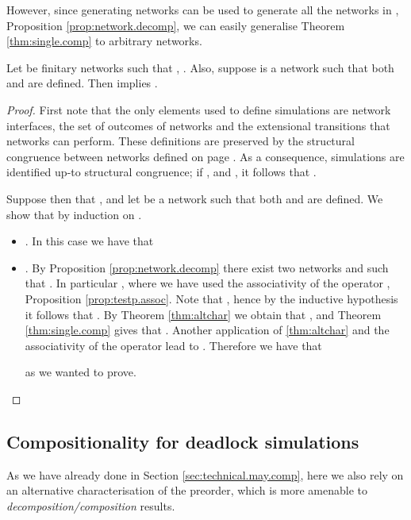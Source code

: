 \documentclass{LMCS}
\begin{document}
However, since generating networks can be used to generate 
all the networks in , Proposition  
\ref{prop:network.decomp}, we can 
easily generalise Theorem \ref{thm:single.comp} to arbitrary 
networks.

\begin{cor}\label{cor:composition}
Let  be finitary networks such that , . 
Also, suppose  is a network such that both 
 and  are defined. 
Then  implies  
.
\end{cor}
\begin{proof}
 First note that the only elements used to define simulations 
 are network interfaces, the set of outcomes of networks and the extensional 
 transitions that networks can perform. These definitions are preserved by the structural congruence between networks
defined on page \pageref{sec:properties}.
 As a  consequence, 
 simulations are identified up-to structural congruence; 
 if ,  and 
 , it follows that .
 
 Suppose then that , and let  be 
 a network such that both  and  are defined. We show that 
  by induction on 
 .
 \begin{itemize}
 \item . In this case we have that 
 
 \item . By Proposition \ref{prop:network.decomp} 
there exist two networks  and  such that 
. 
In particular , where we have used the associativity 
of the operator , Proposition \ref{prop:testp.assoc}. 
Note that , hence by the inductive 
hypothesis it follows that . 
By Theorem \ref{thm:altchar} we obtain that , 
and Theorem \ref{thm:single.comp} gives that 
.
 Another application of \ref{thm:altchar} and the associativity of the operator  lead to 
 . 
 Therefore we have that 
 
 as we wanted to prove.\qedhere
 \end{itemize}
\end{proof}



\subsection{Compositionality for deadlock simulations}
\label{sec:technical.must.comp}


As we have already done in Section \ref{sec:technical.may.comp},
here we also rely on an alternative characterisation of the 
 preorder, which is more amenable to \emph{decomposition/composition}
results.
\end{document}
